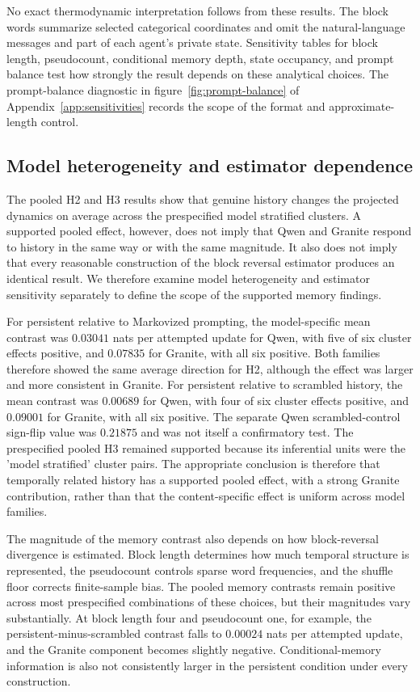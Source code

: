 \documentclass[12pt]{article}
\begin{document}
No exact thermodynamic interpretation follows from these results. The block
words summarize selected categorical coordinates and omit the natural-language
messages and part of each agent's private state. Sensitivity tables for block
length, pseudocount, conditional memory depth, state occupancy, and prompt
balance test how strongly the result depends on these analytical choices. The
prompt-balance diagnostic in figure~\ref{fig:prompt-balance} of
Appendix~\ref{app:sensitivities} records the scope of the format and
approximate-length control.






\subsection{Model heterogeneity and estimator dependence}
\label{sec:memory-heterogeneity}

The pooled H2 and H3 results show that genuine history changes the projected
dynamics on average across the prespecified model stratified clusters. A
supported pooled effect, however, does not imply that Qwen and Granite respond
to history in the same way or with the same magnitude. It also does not imply
that every reasonable construction of the block reversal estimator produces
an identical result. We therefore examine model heterogeneity and estimator
sensitivity separately to define the scope of the supported memory findings.

For persistent relative to Markovized prompting, the model-specific mean
contrast was $0.03041$ nats per attempted update for Qwen, with five of six
cluster effects positive, and $0.07835$ for Granite, with all six positive.
Both families therefore showed the same average direction for H2, although the
effect was larger and more consistent in Granite. For persistent relative to
scrambled history, the mean contrast was $0.00689$ for Qwen, with four of six
cluster effects positive, and $0.09001$ for Granite, with all six positive.
The separate Qwen scrambled-control sign-flip value was $0.21875$ and was not
itself a confirmatory test. The prespecified pooled H3 remained supported
because its inferential units were the 'model stratified' cluster pairs. The
appropriate conclusion is therefore that temporally related history has a
supported pooled effect, with a strong Granite contribution, rather than that
the content-specific effect is uniform across model families.

The magnitude of the memory contrast also depends on how block-reversal
divergence is estimated. Block length determines how much temporal structure
is represented, the pseudocount controls sparse word frequencies, and the
shuffle floor corrects finite-sample bias. The pooled memory contrasts remain
positive across most prespecified combinations of these choices, but their
magnitudes vary substantially. At block length four and pseudocount one, for
example, the persistent-minus-scrambled contrast falls to $0.00024$ nats per
attempted update, and the Granite component becomes slightly negative.
Conditional-memory information is also not consistently larger in the
persistent condition under every construction.
\end{document}
